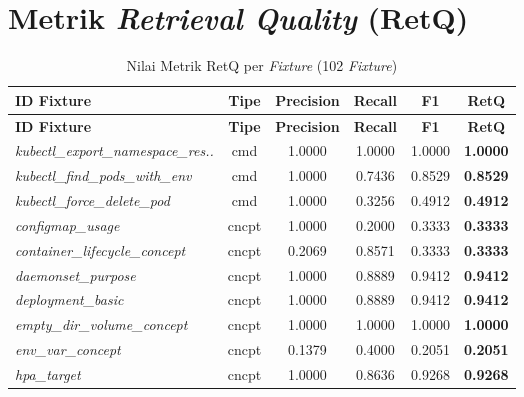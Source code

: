 \section{Metrik \textit{Retrieval Quality} (RetQ)}

\begin{footnotesize}
\begin{longtable}{|p{3.6cm}|c|c|c|c|c|}
\caption{Nilai Metrik RetQ per \textit{Fixture} (102 \textit{Fixture})}
\label{tbl:retq-full} \\
\hline
\textbf{ID Fixture} & \textbf{Tipe} & \textbf{Precision} & \textbf{Recall} & \textbf{F1} & \textbf{RetQ} \\
\hline
\endfirsthead
\hline
\textbf{ID Fixture} & \textbf{Tipe} & \textbf{Precision} & \textbf{Recall} & \textbf{F1} & \textbf{RetQ} \\
\hline
\endhead
\hline
\endfoot
\hline
\endlastfoot
\textit{kubectl\_\allowbreak{}export\_\allowbreak{}namespace\_\allowbreak{}res..} & cmd & 1.0000 & 1.0000 & 1.0000 & \textbf{1.0000} \\
\hline
\textit{kubectl\_\allowbreak{}find\_\allowbreak{}pods\_\allowbreak{}with\_\allowbreak{}env} & cmd & 1.0000 & 0.7436 & 0.8529 & \textbf{0.8529} \\
\hline
\textit{kubectl\_\allowbreak{}force\_\allowbreak{}delete\_\allowbreak{}pod} & cmd & 1.0000 & 0.3256 & 0.4912 & \textbf{0.4912} \\
\hline
\textit{configmap\_\allowbreak{}usage} & cncpt & 1.0000 & 0.2000 & 0.3333 & \textbf{0.3333} \\
\hline
\textit{container\_\allowbreak{}lifecycle\_\allowbreak{}concept} & cncpt & 0.2069 & 0.8571 & 0.3333 & \textbf{0.3333} \\
\hline
\textit{daemonset\_\allowbreak{}purpose} & cncpt & 1.0000 & 0.8889 & 0.9412 & \textbf{0.9412} \\
\hline
\textit{deployment\_\allowbreak{}basic} & cncpt & 1.0000 & 0.8889 & 0.9412 & \textbf{0.9412} \\
\hline
\textit{empty\_\allowbreak{}dir\_\allowbreak{}volume\_\allowbreak{}concept} & cncpt & 1.0000 & 1.0000 & 1.0000 & \textbf{1.0000} \\
\hline
\textit{env\_\allowbreak{}var\_\allowbreak{}concept} & cncpt & 0.1379 & 0.4000 & 0.2051 & \textbf{0.2051} \\
\hline
\textit{hpa\_\allowbreak{}target} & cncpt & 1.0000 & 0.8636 & 0.9268 & \textbf{0.9268} \\

\end{longtable}
\end{footnotesize}
